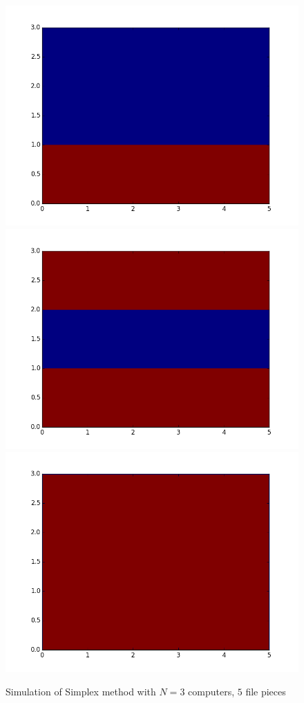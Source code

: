\documentclass[10pt,a4paper]{article}
\begin{document}
\begin{figure}
\begin{center}
	\includegraphics[scale=0.5]{sim0} \\
	\includegraphics[scale=0.5]{sim1} \\
	\includegraphics[scale=0.5]{sim2} \\
\end{center}
	\caption{Simulation of Simplex method with $N = 3$ computers, $5$ file pieces}
\end{figure}
\end{document}
